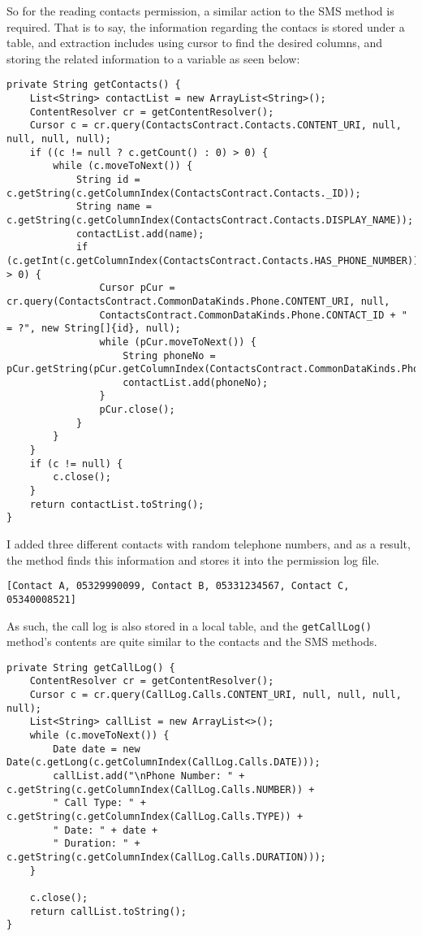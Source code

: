 \documentclass[
  a4paper,  %
  twoside,  %
  bibliography=totoc,
  headsepline,
  cleardoublepage=empty,
  parskip=half,
  draft=false,
  open=any
]{scrbook}
\begin{document}
So for the reading contacts permission, a similar action to the SMS method is required. That is to say, the information regarding the contacs is stored under a table, and extraction includes using cursor to find the desired columns, and storing the related information to a variable as seen below:
\begin{lstlisting}
private String getContacts() {
	List<String> contactList = new ArrayList<String>();
	ContentResolver cr = getContentResolver();
	Cursor c = cr.query(ContactsContract.Contacts.CONTENT_URI, null, null, null, null);
	if ((c != null ? c.getCount() : 0) > 0) {
		while (c.moveToNext()) {
			String id = c.getString(c.getColumnIndex(ContactsContract.Contacts._ID));
			String name = c.getString(c.getColumnIndex(ContactsContract.Contacts.DISPLAY_NAME));
			contactList.add(name);
			if (c.getInt(c.getColumnIndex(ContactsContract.Contacts.HAS_PHONE_NUMBER)) > 0) {
				Cursor pCur = cr.query(ContactsContract.CommonDataKinds.Phone.CONTENT_URI, null,
				ContactsContract.CommonDataKinds.Phone.CONTACT_ID + " = ?", new String[]{id}, null);
				while (pCur.moveToNext()) {
					String phoneNo = pCur.getString(pCur.getColumnIndex(ContactsContract.CommonDataKinds.Phone.NUMBER));
					contactList.add(phoneNo);
				}
				pCur.close();
			}
		}
	}
	if (c != null) {
		c.close();
	}
	return contactList.toString();
}
\end{lstlisting}

I added three different contacts with random telephone numbers, and as a result, the method finds this information and stores it into the permission log file. 
\begin{lstlisting}
[Contact A, 05329990099, Contact B, 05331234567, Contact C, 05340008521]
\end{lstlisting}

As such, the call log is also stored in a local table, and the \texttt{getCallLog()} method's contents are quite similar to the contacts and the SMS methods.
\begin{lstlisting}
private String getCallLog() {
	ContentResolver cr = getContentResolver();
	Cursor c = cr.query(CallLog.Calls.CONTENT_URI, null, null, null, null);
	List<String> callList = new ArrayList<>();
	while (c.moveToNext()) {
		Date date = new Date(c.getLong(c.getColumnIndex(CallLog.Calls.DATE)));
		callList.add("\nPhone Number: " + c.getString(c.getColumnIndex(CallLog.Calls.NUMBER)) +
		" Call Type: " + c.getString(c.getColumnIndex(CallLog.Calls.TYPE)) +
		" Date: " + date +
		" Duration: " + c.getString(c.getColumnIndex(CallLog.Calls.DURATION)));
	}
	
	c.close();
	return callList.toString();
}
\end{lstlisting}
\end{document}
